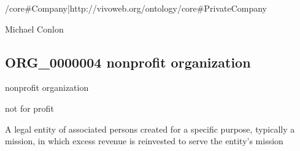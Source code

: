 \documentclass[letterpaper,10pt,english]{sphinxmanual}
\begin{document}
\begin{sphinxShadowBox}

\sphinxAtStartPar
{}/core\#Company|http://vivoweb.org/ontology/core\#PrivateCompany
\end{sphinxShadowBox}

\begin{sphinxShadowBox}

\sphinxAtStartPar
Michael Conlon 
\end{sphinxShadowBox}
\begin{quote}

\ignorespaces \end{quote}


\subsection{ORG\_0000004 \sphinxhyphen{} nonprofit organization}
\label{\detokenize{doc-ORG_0000004:org-0000004-nonprofit-organization}}\label{\detokenize{doc-ORG_0000004:index-0}}\label{\detokenize{doc-ORG_0000004::doc}}
\begin{sphinxShadowBox}

\sphinxAtStartPar
nonprofit organization
\end{sphinxShadowBox}

\begin{sphinxShadowBox}

\sphinxAtStartPar
not for profit
\end{sphinxShadowBox}

\begin{sphinxShadowBox}

\sphinxAtStartPar
{\hyperref[\detokenize{doc-ORG_0000001::doc}]{}}
\end{sphinxShadowBox}

\begin{sphinxShadowBox}

\sphinxAtStartPar
A legal entity of associated persons created for a specific purpose, typically a mission, in which excess revenue is reinvested to serve the entity’s mission
\end{sphinxShadowBox}
\end{document}
